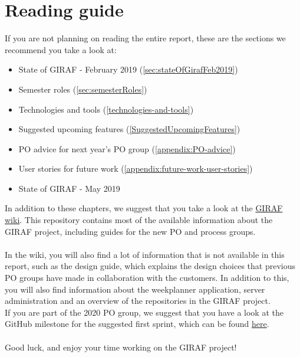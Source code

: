 \chapter*{Reading guide}
If you are not planning on reading the entire report, these are the sections we recommend you take a look at:

\begin{itemize}
    \item State of GIRAF - February 2019 (\autoref{sec:stateOfGirafFeb2019})
    \item Semester roles (\autoref{sec:semesterRoles})
    \item Technologies and tools (\autoref{technologies-and-tools})
    \item Suggested upcoming features (\autoref{SuggestedUpcomingFeatures})
    \item PO advice for next year's PO group (\autoref{appendix:PO-advice})
    \item User stories for future work (\autoref{appendix:future-work-user-stories})
    \item State of GIRAF - May 2019
\end{itemize}
\noindent
In addition to these chapters, we suggest that you take a look at the \href{https://github.com/aau-giraf/wiki}{GIRAF wiki}.
This repository contains most of the available information about the GIRAF project, including guides for the new PO and process groups.
\\\\
In the wiki, you will also find a lot of information that is not available in this report, such as the design guide, which explains the design choices that previous PO groups have made in collaboration with the customers.
In addition to this, you will also find information about the weekplanner application, server administration and an overview of the repositories in the GIRAF project.
\\
If you are part of the 2020 PO group, we suggest that you have a look at the GitHub milestone for the suggested first sprint, which can be found \href{https://github.com/issues?utf8=%E2%9C%93&q=milestone%3A%222020S1%22+user%3Aaau-giraf+is%3Aopen+}{here}.
\\\\
Good luck, and enjoy your time working on the GIRAF project!
